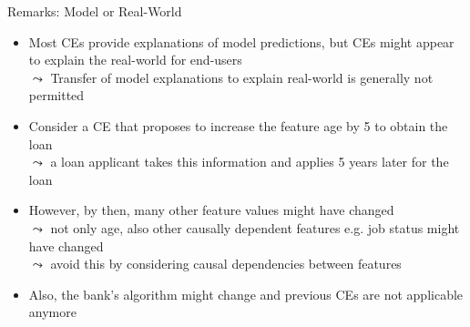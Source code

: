\documentclass[11pt,compress,t,notes=noshow, aspectratio=169, xcolor=table, usenames,dvipsnames]{beamer}
\begin{document}
\begin{frame}{Remarks: Model or Real-World}

	\begin{itemize}[<+->]
	\item Most CEs provide explanations of model predictions, but CEs might appear to explain the real-world for end-users\\
$\leadsto$ Transfer of model explanations to explain real-world is generally not permitted
	\item Consider a CE that proposes to increase the feature age by 5 to obtain the loan\\
	$\leadsto$ a loan applicant takes this information and applies 5 years later for the loan
	\item However, by then, many 
	other feature values 
	might have changed\\
	$\leadsto$ not only age, also other causally dependent features e.g. job status might have changed \\%
	$\leadsto$  avoid this by considering causal dependencies between features
	\item Also, the bank's algorithm might change and previous CEs are not applicable anymore
	\end{itemize}
\end{frame}


\endlecture
\end{document}
